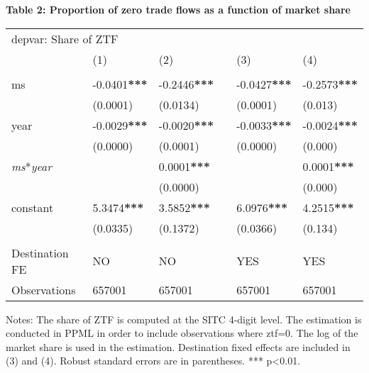 \documentclass[12pt,twoside,a4paper,notitlepage]{article}
\begin{document}
{\textbf{ \label{ref-005}Table 2: Proportion of zero trade flows as a function of market share}
\begin{table}
\begin{tabularx}{\textwidth}{
p{}
p{}
p{}
p{}
p{}
p{}
p{}}
\multicolumn{7}{l}{ depvar: Share of ZTF} \\
 & (1) & (2) & & (3) & \multicolumn{2}{l}{(4)} \\
 & & & & & \multicolumn{2}{l}{} \\
ms & -0.0401\textbf{***} & -0.2446\textbf{***} & & -0.0427\textbf{***} & \multicolumn{2}{l}{-0.2573\textbf{***}} \\
 & (0.0001) & (0.0134) & & (0.0001) & \multicolumn{2}{l}{(0.013)} \\
year & -0.0029\textbf{***} & -0.0020\textbf{***} & & -0.0033\textbf{***} & \multicolumn{2}{l}{-0.0024\textbf{***}} \\
 & (0.0000) & (0.0001) & & (0.0000) & \multicolumn{2}{l}{(0.000)} \\
\textit{ms}*\textit{year} & & 0.0001\textbf{***} & & & \multicolumn{2}{l}{0.0001\textbf{***}} \\
 & & (0.0000) & & & \multicolumn{2}{l}{(0.000)} \\
constant & 5.3474\textbf{***} & 3.5852\textbf{***} & & 6.0976\textbf{***} & \multicolumn{2}{l}{4.2515\textbf{***}} \\
 & (0.0335) & (0.1372) & & (0.0366) & \multicolumn{2}{l}{(0.134)} \\
 & & & & \multicolumn{3}{l}{} \\
Destination FE & NO & NO & & YES & \multicolumn{2}{l}{YES} \\
Observations & 657001 & 657001 & & 657001 & \multicolumn{2}{l}{657001} \\

\end{tabularx}

\end{table}

Notes: The share of ZTF is computed at the SITC 4-digit level. The estimation is conducted in PPML in order to include observations where ztf=0. The log of the market share is used in the estimation. Destination fixed effects are included in (3) and (4). Robust standard errors are in parentheses. *** p{\textless}0.01.

}
\end{document}
